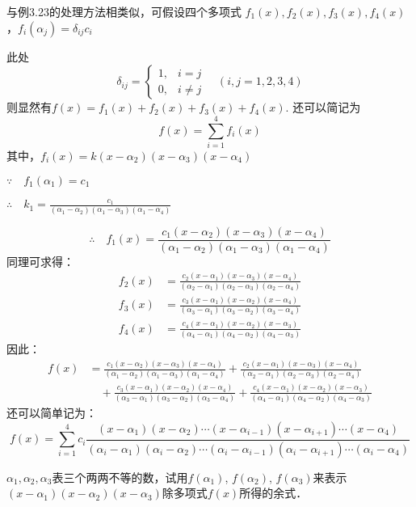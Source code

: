\begin{solution}
    与例3.23的处理方法相类似，可假设四个多项式
$f_1(x),f_2(x),f_3(x),f_4(x)$，$f_i(\alpha_j)=\delta_{ij}c_i$    
    
    此处$$\delta_{ij}=\begin{cases}
        1,& i=j\\
        0,& i\ne j
    \end{cases}\quad  (i,j=1, 2, 3, 4)$$
则显然有$f(x)=f_1(x)+f_2(x)+f_3(x)+f_4(x)$.
还可以简记为$$f(x)=\sum^4_{i=1}f_i(x)$$
其中，$f_i(x)=k(x-\alpha_2)(x-\alpha_3)(x-\alpha_4)$

$\because\quad f_1(\alpha_1)=c_1$

$\therefore\quad k_1=\frac{c_1}{(\alpha_1-\alpha_2)(\alpha_1-\alpha_3)(\alpha_1-\alpha_4)}$

\[\therefore\quad f_1(x)=\frac{c_1(x-\alpha_2)(x-\alpha_3)(x-\alpha_4)}{(\alpha_1-\alpha_2)(\alpha_1-\alpha_3)(\alpha_1-\alpha_4)}\]
同理可求得：
\[\begin{split}
    f_2(x)&=\frac{c_2(x-\alpha_1)(x-\alpha_3)(x-\alpha_4)}{(\alpha_2-\alpha_1)(\alpha_2-\alpha_3)(\alpha_2-\alpha_4)}\\
    f_3(x)&=\frac{c_3(x-\alpha_1)(x-\alpha_2)(x-\alpha_4)}{(\alpha_3-\alpha_1)(\alpha_3-\alpha_2)(\alpha_3-\alpha_4)}\\
    f_4(x)&=\frac{c_4(x-\alpha_1)(x-\alpha_2)(x-\alpha_3)}{(\alpha_4-\alpha_1)(\alpha_4-\alpha_2)(\alpha_4-\alpha_3)}
\end{split}\]
因此：
\[\begin{split}
f(x)&=\frac{c_1(x-\alpha_2)(x-\alpha_3)(x-\alpha_4)}{(\alpha_1-\alpha_2)(\alpha_1-\alpha_3)(\alpha_1-\alpha_4)}+\frac{c_2(x-\alpha_1)(x-\alpha_3)(x-\alpha_4)}{(\alpha_2-\alpha_1)(\alpha_2-\alpha_3)(\alpha_2-\alpha_4)}\\
&\quad +\frac{c_3(x-\alpha_1)(x-\alpha_2)(x-\alpha_4)}{(\alpha_3-\alpha_1)(\alpha_3-\alpha_2)(\alpha_3-\alpha_4)}+\frac{c_4(x-\alpha_1)(x-\alpha_2)(x-\alpha_3)}{(\alpha_4-\alpha_1)(\alpha_4-\alpha_2)(\alpha_4-\alpha_3)}
\end{split}\]
还可以简单记为：
\[f(x)=\sum^4_{i=1} c_i\frac{(x-\alpha_1)(x-\alpha_2)\cdots (x-\alpha_{i-1})(x-\alpha_{i+1})\cdots (x-\alpha_4)}{(\alpha_i-\alpha_1)(\alpha_i-\alpha_2)\cdots (\alpha_i-\alpha_{i-1})(\alpha_i-\alpha_{i+1})\cdots (\alpha_i-\alpha_4)}\]
\end{solution}


\begin{example}
$\alpha_1,\alpha_2,\alpha_3$表三个两两不等的数，试用$f(\alpha_1)$, $f(\alpha_2)$, $f(\alpha_3)$来表示$(x-\alpha_1)(x-\alpha_2)(x-\alpha_3)$除多项式$f(x)$所得的余式．
\end{example}

